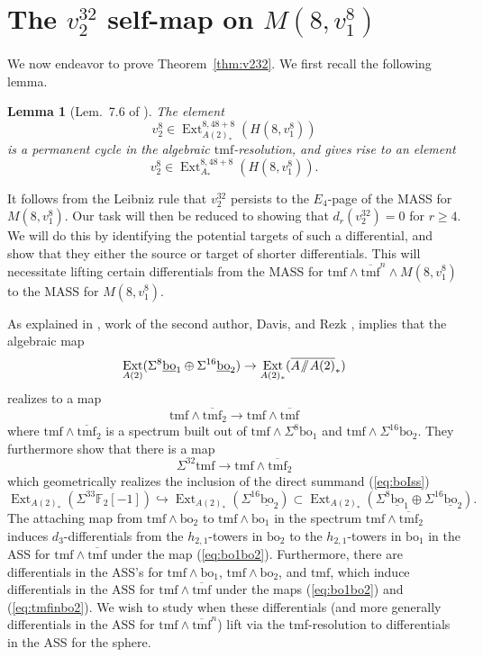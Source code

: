 \documentclass[10pt]{amsart}
\newcommand{\sslash}{\mathbin{/\mkern-6mu/}}
\newcommand{\mmod}{\! \sslash \!}
\newcommand{\ul}[1]{\underline{#1}}
\newcommand{\br}[1]{\overline{#1}}
\newcommand{\FF}{\mathbb{F}}
\newcommand{\tmf}{\mathrm{tmf}}
\newcommand{\bo}{\mathrm{bo}}
\newcommand{\bou}{\ul{\bo}}
\newtheorem{lem}[equation]{Lemma}
\theoremstyle{definition}
\numberwithin{equation}{section}
\numberwithin{figure}{section}
\DeclareMathOperator{\Ext}{Ext}
\begin{document}
\section{The $v_2^{32}$ self-map on $M(8,v_1^8)$}\label{sec:v232}

We now endeavor to prove Theorem~\ref{thm:v232}.  We first recall the following lemma.

\begin{lem}[Lem.~7.6 of \cite{BHHM2}]\label{lem:v2^8}
The element
$$ v_2^8 \in \Ext^{8,48+8}_{A(2)_*}(H(8,v_1^8)) $$
is a permanent cycle in the algebraic $\tmf$-resolution, and gives rise to an element
$$ v_2^8 \in \Ext^{8,48+8}_{A_*}(H(8,v_1^8)). $$
\end{lem}

It follows from the Leibniz rule that $v_2^{32}$ persists to the $E_4$-page of the MASS for $M(8,v_1^8)$.  Our task will then be reduced to showing that $d_r(v_2^{32}) = 0$ for $r \ge 4$.  We will do this by identifying the potential targets of such a differential, and show that they either the source or target of shorter differentials.  This will necessitate lifting certain differentials from the MASS for $\tmf \wedge \br{\tmf}^n \wedge M(8,v_1^8)$ to the MASS for $M(8,v_1^8)$.

As explained in \cite[Sec.~7.4]{BOSS}, work of the second author, Davis, and Rezk \cite{MahowaldRezk},\cite{DavisMahowald} implies that the algebraic map
$$ \Ext_{A(2)}(\Sigma^8 \bou_1 \oplus \Sigma^{16}\bou_2) \rightarrow \Ext_{A(2)_*}(\br{A\mmod A(2)}_*) $$
realizes to a map
\begin{equation}\label{eq:bo1bo2}
\tmf \wedge \br{\tmf}_2  \rightarrow \tmf \wedge \br{\tmf} 
\end{equation}
where $\tmf \wedge \br{\tmf}_2$ is a spectrum built out of $\tmf \wedge \Sigma^8 \bo_1$ and $\tmf \wedge \Sigma^{16} \bo_2$.
They furthermore show that there is a map
\begin{equation}\label{eq:tmfinbo2}
 \Sigma^{32} \tmf \rightarrow \tmf \wedge \br{\tmf}_2 
 \end{equation}
which geometrically realizes the inclusion of the direct summand (\ref{eq:boIss})
$$ \Ext_{A(2)_*}(\Sigma^{33}\FF_2[-1]) \hookrightarrow \Ext_{A(2)_*}(\Sigma^{16} \bou_2) \subset \Ext_{A(2)_*}(\Sigma^8 \bou_1 \oplus \Sigma^{16} \bou_2). $$
The attaching map from $\tmf \wedge \bo_2$ to $\tmf \wedge \bo_1$ in the spectrum $\tmf\wedge \br{\tmf}_2$ induces $d_3$-differentials from the $h_{2,1}$-towers in $\bo_2$ to the $h_{2,1}$-towers in $\bo_1$ in the ASS for $\tmf \wedge \br{\tmf}$ under the map (\ref{eq:bo1bo2}).  Furthermore, there are differentials in the ASS's for $\tmf \wedge \bo_1$, $\tmf \wedge \bo_2$, and $\tmf$, which induce differentials in the ASS for $\tmf \wedge \br{\tmf}$ under the maps (\ref{eq:bo1bo2}) and (\ref{eq:tmfinbo2}).  We wish to study when these differentials (and more generally differentials in the ASS for $\tmf \wedge \br{\tmf}^n$) lift via the tmf-resolution to differentials in the ASS for the sphere.
\end{document}
